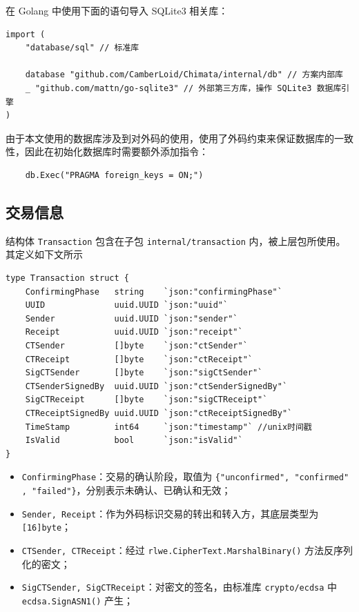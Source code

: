 在 Golang 中使用下面的语句导入 SQLite3 相关库：

\begin{verbatim}
import (
    "database/sql" // 标准库

    database "github.com/CamberLoid/Chimata/internal/db" // 方案内部库
    _ "github.com/mattn/go-sqlite3" // 外部第三方库，操作 SQLite3 数据库引擎
)
\end{verbatim}

由于本文使用的数据库涉及到对外码的使用，使用了外码约束来保证数据库的一致性，因此在初始化数据库时需要额外添加指令：

\begin{verbatim}
    db.Exec("PRAGMA foreign_keys = ON;")
\end{verbatim}
 
\subsection{交易信息}

结构体 \verb|Transaction| 包含在子包 \verb|internal/transaction| 内，被上层包所使用。其定义如下文所示

\begin{verbatim}
type Transaction struct {
    ConfirmingPhase   string    `json:"confirmingPhase"`
    UUID              uuid.UUID `json:"uuid"`
    Sender            uuid.UUID `json:"sender"`
    Receipt           uuid.UUID `json:"receipt"`
    CTSender          []byte    `json:"ctSender"`
    CTReceipt         []byte    `json:"ctReceipt"`
    SigCTSender       []byte    `json:"sigCtSender"`
    CTSenderSignedBy  uuid.UUID `json:"ctSenderSignedBy"`
    SigCTReceipt      []byte    `json:"sigCTReceipt"`
    CTReceiptSignedBy uuid.UUID `json:"ctReceiptSignedBy"`
    TimeStamp         int64     `json:"timestamp"` //unix时间戳
    IsValid           bool      `json:"isValid"`
}    
\end{verbatim}

\begin{itemize}
    \item \verb|ConfirmingPhase|：交易的确认阶段，取值为 \verb|{"unconfirmed", "confirmed"|\\
    \verb|, "failed"}|，分别表示未确认、已确认和无效；
    \item \verb|Sender, Receipt|：作为外码标识交易的转出和转入方，其底层类型为 \verb|[16]byte|；
    \item \verb|CTSender, CTReceipt|：经过 \verb|rlwe.CipherText.MarshalBinary()| 方法反序列化的密文；
    \item \verb|SigCTSender, SigCTReceipt|：对密文的签名，由标准库 \verb|crypto/ecdsa| 中 \verb|ecdsa.SignASN1()| 产生；
\end{itemize}


